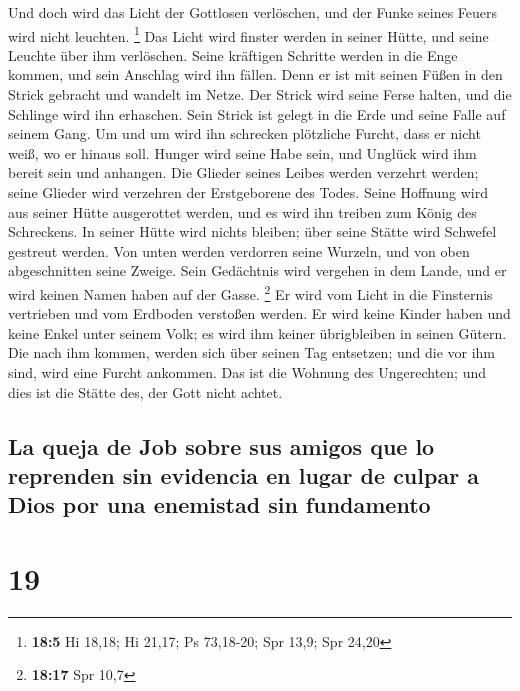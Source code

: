  Und doch wird das Licht der Gottlosen verlöschen, und der
Funke seines Feuers wird nicht leuchten. \footnote{\textbf{18:5} Hi
  18,18; Hi 21,17; Ps 73,18-20; Spr 13,9; Spr 24,20}  Das
Licht wird finster werden in seiner Hütte, und seine Leuchte über ihm
verlöschen.  Seine kräftigen Schritte werden in die Enge
kommen, und sein Anschlag wird ihn fällen.  Denn er ist
mit seinen Füßen in den Strick gebracht und wandelt im Netze.
 Der Strick wird seine Ferse halten, und die Schlinge wird
ihn erhaschen.  Sein Strick ist gelegt in die Erde und
seine Falle auf seinem Gang.  Um und um wird ihn
schrecken plötzliche Furcht, dass er nicht weiß, wo er hinaus soll.
 Hunger wird seine Habe sein, und Unglück wird ihm bereit
sein und anhangen.  Die Glieder seines Leibes werden
verzehrt werden; seine Glieder wird verzehren der Erstgeborene des
Todes.  Seine Hoffnung wird aus seiner Hütte ausgerottet
werden, und es wird ihn treiben zum König des Schreckens.
 In seiner Hütte wird nichts bleiben; über seine Stätte
wird Schwefel gestreut werden.  Von unten werden
verdorren seine Wurzeln, und von oben abgeschnitten seine Zweige.
 Sein Gedächtnis wird vergehen in dem Lande, und er wird
keinen Namen haben auf der Gasse. \footnote{\textbf{18:17} Spr 10,7}
 Er wird vom Licht in die Finsternis vertrieben und vom
Erdboden verstoßen werden.  Er wird keine Kinder haben
und keine Enkel unter seinem Volk; es wird ihm keiner übrigbleiben in
seinen Gütern.  Die nach ihm kommen, werden sich über
seinen Tag entsetzen; und die vor ihm sind, wird eine Furcht ankommen.
 Das ist die Wohnung des Ungerechten; und dies ist die
Stätte des, der Gott nicht achtet.

\hypertarget{la-queja-de-job-sobre-sus-amigos-que-lo-reprenden-sin-evidencia-en-lugar-de-culpar-a-dios-por-una-enemistad-sin-fundamento}{%
\subsection{La queja de Job sobre sus amigos que lo reprenden sin
evidencia en lugar de culpar a Dios por una enemistad sin
fundamento}\label{la-queja-de-job-sobre-sus-amigos-que-lo-reprenden-sin-evidencia-en-lugar-de-culpar-a-dios-por-una-enemistad-sin-fundamento}}

\hypertarget{section-18}{%
\section{19}\label{section-18}}

